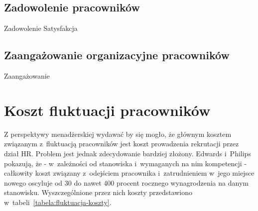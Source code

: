 
\subsection{Zadowolenie pracowników}\label{sec:czynniki-wplywajace-na-fluktuacje:zadowolenie}
Zadowolenie
Satysfakcja

\subsection{Zaangażowanie organizacyjne pracowników}\label{sec:czynniki-wplywajace-na-fluktuacje:zaangazowanie-organizacyjne}
Zaangażowanie

\section{Koszt fluktuacji pracowników}\label{sec:koszt-fluktuacji}

Z perspektywy menadżerskiej wydawać by się mogło, że głównym kosztem związanym z~fluktuacją pracowników jest koszt prowadzenia rekrutacji przez dział HR.
Problem jest jednak zdecydowanie bardziej złożony.
Edwards i~Philips pokazują, że - w~zależności od stanowiska i~wymaganych na nim kompetencji -
całkowity koszt związany z~odejściem pracownika i~zatrudnieniem w~jego miejsce nowego oscyluje od 30 do nawet 400 procent
rocznego wynagrodzenia na danym stanowisku. Wyszczególnione przez nich koszty przedstawiono w~tabeli~\ref{tabela:fluktuacja-koszty}.


